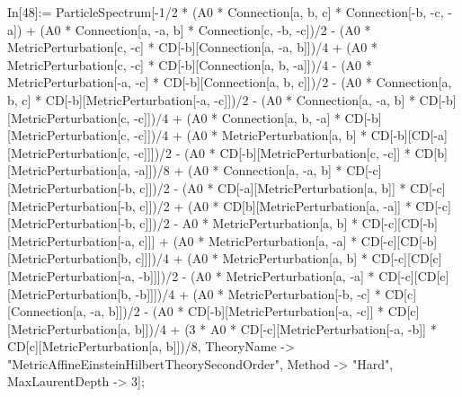 In[48]:= ParticleSpectrum[-1/2 * (A0 * Connection[a, b, c] * Connection[-b, -c, -a]) + (A0 * Connection[a, -a, b] * Connection[c, -b, -c])/2 - (A0 * MetricPerturbation[c, -c] * CD[-b][Connection[a, -a, b]])/4 + (A0 * MetricPerturbation[c, -c] * CD[-b][Connection[a, b, -a]])/4 - (A0 * MetricPerturbation[-a, -c] * CD[-b][Connection[a, b, c]])/2 - (A0 * Connection[a, b, c] * CD[-b][MetricPerturbation[-a, -c]])/2 - (A0 * Connection[a, -a, b] * CD[-b][MetricPerturbation[c, -c]])/4 + (A0 * Connection[a, b, -a] * CD[-b][MetricPerturbation[c, -c]])/4 + (A0 * MetricPerturbation[a, b] * CD[-b][CD[-a][MetricPerturbation[c, -c]]])/2 - (A0 * CD[-b][MetricPerturbation[c, -c]] * CD[b][MetricPerturbation[a, -a]])/8 + (A0 * Connection[a, -a, b] * CD[-c][MetricPerturbation[-b, c]])/2 - (A0 * CD[-a][MetricPerturbation[a, b]] * CD[-c][MetricPerturbation[-b, c]])/2 + (A0 * CD[b][MetricPerturbation[a, -a]] * CD[-c][MetricPerturbation[-b, c]])/2 - A0 * MetricPerturbation[a, b] * CD[-c][CD[-b][MetricPerturbation[-a, c]]] + (A0 * MetricPerturbation[a, -a] * CD[-c][CD[-b][MetricPerturbation[b, c]]])/4 + (A0 * MetricPerturbation[a, b] * CD[-c][CD[c][MetricPerturbation[-a, -b]]])/2 - (A0 * MetricPerturbation[a, -a] * CD[-c][CD[c][MetricPerturbation[b, -b]]])/4 + (A0 * MetricPerturbation[-b, -c] * CD[c][Connection[a, -a, b]])/2 - (A0 * CD[-b][MetricPerturbation[-a, -c]] * CD[c][MetricPerturbation[a, b]])/4 + (3 * A0 * CD[-c][MetricPerturbation[-a, -b]] * CD[c][MetricPerturbation[a, b]])/8, TheoryName -> "MetricAffineEinsteinHilbertTheorySecondOrder", Method -> "Hard", MaxLaurentDepth -> 3]; 